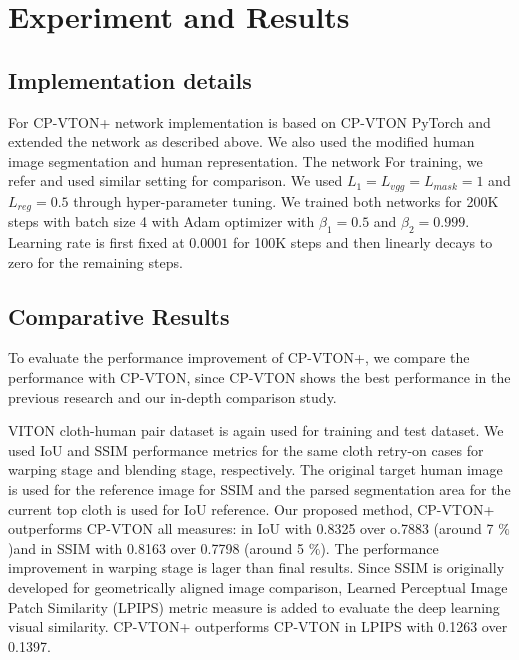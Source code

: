 \section{Experiment and Results} 

\subsection{Implementation details} 

For CP-VTON+ network implementation is based on CP-VTON PyTorch and extended the network as described above. We also used the modified human image segmentation and human representation. The network  For training, we refer \cite{Wang2018TowardCI} and used similar setting for comparison. We used $L_1 = L_{vgg} = L_{mask} =1$ and $L_{reg} = 0.5$ through  hyper-parameter tuning. We trained both networks for 200K steps with batch size 4 with Adam optimizer with $\beta_1 = 0.5$ and $\beta_2 = 0.999$. Learning rate is first fixed at $0.0001$ for 100K steps and then linearly decays to zero for the remaining steps. 

\subsection{Comparative Results}

To evaluate the performance improvement of CP-VTON+, we compare the performance with CP-VTON, since CP-VTON shows the best performance in the previous research and our in-depth comparison study.

VITON cloth-human pair dataset is again used for training and test dataset. We used IoU and SSIM performance metrics for the same cloth retry-on cases for warping stage and blending stage, respectively. The original target human image is used for the reference image for SSIM and the parsed segmentation area for the current top cloth is used for IoU reference. Our proposed method, CP-VTON+ outperforms CP-VTON all measures: in IoU  with  0.8325 over o.7883 (around 7 $\%$)and in SSIM with 0.8163 over 0.7798 (around 5 $\%$). The performance improvement in warping stage is lager than final results. 
Since SSIM is originally developed for geometrically aligned image comparison, Learned Perceptual Image Patch Similarity (LPIPS) metric \cite{zhang2018unreasonable} measure is added to evaluate the deep learning visual similarity. CP-VTON+ outperforms CP-VTON in LPIPS with 0.1263 over 0.1397.



